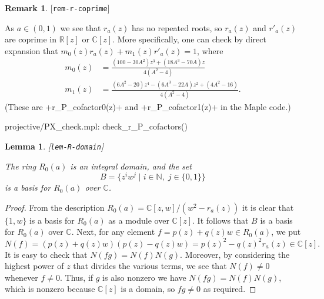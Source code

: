 \documentclass[reqno]{amsart}
\newcommand{\lbl}[1]{\label{#1}\textup{[\texttt{#1}]}\par}
\newcommand{\lbl}{\label}
\newcommand{\N}         {{\mathbb{N}}}
\newcommand{\R}         {{\mathbb{R}}}
\newcommand{\C}         {{\mathbb{C}}}
\newcommand{\st}        {\;|\;}
\renewcommand{\:}{\colon}
\newtheorem{lemma}[theorem]{Lemma}
\theoremstyle{definition}
\newtheorem{remark}[theorem]{Remark}
\begin{document}
\begin{remark}\lbl{rem-r-coprime}
 As $a\in(0,1)$ we see that $r_a(z)$ has no repeated roots, so
 $r_a(z)$ and $r'_a(z)$ are coprime in $\R[z]$ or $\C[z]$.  More
 specifically, one can check by direct expansion that
 $m_0(z)r_a(z)+m_1(z)r'_a(z)=1$, where
 \begin{align*}
  m_0(z) &= \frac{(100-30A^2)z^3+(18A^3-70A)z}{4(A^2-4)} \\
  m_1(z) &= \frac{(6A^2-20)z^4-(6A^3-22A)z^2+(4A^2-16)}{4(A^2-4)}.
 \end{align*}
 (These are \mcode+r_P_cofactor0(z)+ and \mcode+r_P_cofactor1(z)+ in the
 Maple code.)
 \begin{checks}
  projective/PX_check.mpl: check_r_P_cofactors()
 \end{checks}
\end{remark}

\begin{lemma}\lbl{lem-R-domain}
 The ring $R_0(a)$ is an integral domain, and the set
 \[ B = \{z^iw^j\st i\in\N,\;j\in\{0,1\}\} \]
 is a basis for $R_0(a)$ over $\C$.
\end{lemma}
\begin{proof}
 From the description $R_0(a)=\C[z,w]/(w^2-r_a(z))$ it is clear that
 $\{1,w\}$ is a basis for $R_0(a)$ as a module over $\C[z]$.  It
 follows that $B$ is a basis for $R_0(a)$ over $\C$.  Next, for any
 element $f=p(z)+q(z)w\in R_0(a)$, we put
 \[ N(f) = (p(z)+q(z)w)(p(z)-q(z)w)=p(z)^2-q(z)^2r_a(z) \in\C[z]. \]
 It is easy to check that $N(fg)=N(f)N(g)$.  Moreover, by considering
 the highest power of $z$ that divides the various terms, we see that
 $N(f)\neq 0$ whenever $f\neq 0$.  Thus, if $g$ is also nonzero we
 have $N(fg)=N(f)N(g)$, which is nonzero because $\C[z]$ is a domain,
 so $fg\neq 0$ as required.
\end{proof}
\end{document}
